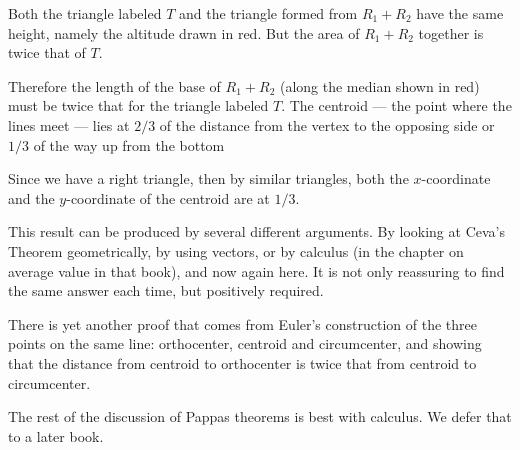 \documentclass[11pt, oneside]{article}   	%
\begin{document}
Both the triangle labeled $T$ and the triangle formed from $R_1 + R_2$ have the same height, namely the altitude drawn in red.  But the area of $R_1 + R_2$ together is twice that of $T$.  

Therefore the length of the base of $R_1 + R_2$ (along the median shown in red) must be twice that for the triangle labeled $T$.  The centroid --- the point where the lines meet --- lies at $2/3$ of the distance from the vertex to the opposing side or $1/3$ of the way up from the bottom

Since we have a right triangle, then by similar triangles, both the $x$-coordinate and the $y$-coordinate of the centroid are at $1/3$.

This result can be produced by several different arguments.  By looking at Ceva's Theorem geometrically, by using vectors, or by calculus (in the chapter on average value in that book), and now again here.  It is not only reassuring to find the same answer each time, but positively required.

There is yet another proof that comes from Euler's construction of the three points on the same line:  orthocenter, centroid and circumcenter, and showing that the distance from centroid to orthocenter is twice that from centroid to circumcenter.

The rest of the discussion of Pappas theorems is best with calculus.  We defer that to a later book.
\end{document}
